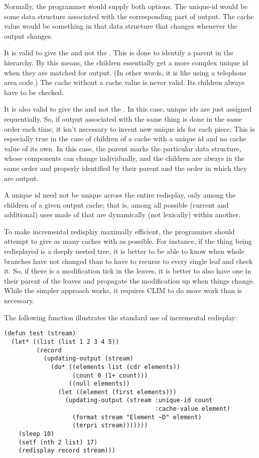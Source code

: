 Normally, the programmer would supply both options. The unique-id would be some
data structure associated with the corresponding part of output.  The cache
value would be something in that data structure that changes whenever the output
changes.

It is valid to give the  and not the .  This is
done to identify a parent in the hierarchy.  By this means, the children
essentially get a more complex unique id when they are matched for output.  (In
other words, it is like using a telephone area code.)  The cache without a cache
value is never valid.  Its children always have to be checked.

It is also valid to give the  and not the .  In
this case, unique ids are just assigned sequentially.  So, if output associated
with the same thing is done in the same order each time, it isn't necessary to
invent new unique ids for each piece.  This is especially true in the case of
children of a cache with a unique id and no cache value of its own.  In this
case, the parent marks the particular data structure, whose components can
change individually, and the children are always in the same order and properly
identified by their parent and the order in which they are output.

A unique id need not be unique across the entire redisplay, only among the
children of a given output cache; that is, among all possible (current and
additional) uses made of  that are dynamically (not
lexically) within another.

To make incremental redisplay maximally efficient, the programmer should attempt
to give as many caches with  as possible.  For instance, if the
thing being redisplayed is a deeply nested tree, it is better to be able to know
when whole branches have not changed than to have to recurse to every single
leaf and check it.  So, if there is a modification tick in the leaves, it is
better to also have one in their parent of the leaves and propagate the
modification up when things change.  While the simpler approach works, it
requires CLIM to do more work than is necessary.

The following function illustrates the standard use of incremental redisplay:

\begin{verbatim}
(defun test (stream)
  (let* ((list (list 1 2 3 4 5))
         (record
           (updating-output (stream)
             (do* ((elements list (cdr elements))
                   (count 0 (1+ count)))
                  ((null elements))
               (let ((element (first elements)))
                 (updating-output (stream :unique-id count
                                          :cache-value element)
                   (format stream "Element ~D" element)
                   (terpri stream)))))))
    (sleep 10)
    (setf (nth 2 list) 17)
    (redisplay record stream)))
\end{verbatim}

